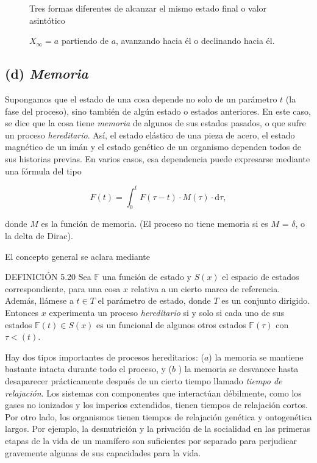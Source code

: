 \begin{justifying}
\begin{figure}[h!]
    \vspace{10pt} %
    
    
    \parbox{\textwidth}{
        \centering
        \scriptsize 
         Tres formas diferentes de alcanzar el mismo estado final o valor asintótico
        
        $X_{\infty} = a$ partiendo de $a$, avanzando hacia él o declinando hacia él.
    }
    
    \end{figure}

    \newpage

    \subsection*{(d)\textit{ Memoria}}
    \noindent Supongamos que el estado de una cosa depende no solo de un parámetro $t$ (la fase
    del proceso), sino también de algún estado o estados anteriores. 
    En este caso, se dice que la cosa tiene {\textit{memoria}} de algunos de sus estados pasados, 
    o que sufre un proceso {\textit{hereditario}}. Así, el estado elástico de una pieza
    de acero, el estado magnético de un imán y el estado genético de un organismo 
    dependen todos de sus historias previas. En varios casos, esa dependencia puede expresarse mediante una fórmula del tipo

    \[
        F(t) = \int_0^t F(\tau - t) \cdot M(\tau) \cdot \mathrm{d}\tau,
    \]

    \noindent donde $M$ es la función de memoria. (El proceso no tiene memoria si es $M$ = $\delta$,
    o la delta de Dirac).

    El concepto general se aclara mediante

    \medskip

    \noindent DEFINICIÓN 5.20 Sea $\mathbb{F}$ una función de estado y $S(x)$ el espacio de estados correspondiente,
    para una cosa $x$ relativa a un cierto marco de referencia. Además,
    llámese a $t \in T$ el parámetro de estado, donde $T$ es un conjunto dirigido. 
    Entonces $x$ experimenta un proceso {\textit{hereditario}} si y solo si cada uno de sus estados $\mathbb{F}(t) \in S(x)$ es un funcional 
    de algunos otros estados $\mathbb{F}(\tau)$ con $\tau<(t)$.

    Hay dos tipos importantes de procesos hereditarios: ($a$) la
    memoria se mantiene bastante intacta durante todo el proceso, y ($b$ ) 
    la memoria se desvanece hasta desaparecer prácticamente después de un cierto tiempo llamado {\textit{tiempo de relajación}}. 
    Los sistemas con componentes que interactúan débilmente, como
    los gases no ionizados y los imperios extendidos, tienen tiempos de relajación cortos. 
    Por otro lado, los organismos tienen tiempos de relajación genética y ontogenética largos. 
    Por ejemplo, la desnutrición y la privación de la socialidad en las primeras etapas de la vida de un mamífero son suficientes 
    por separado para perjudicar gravemente algunas de sus capacidades para la vida.


\end{justifying}
